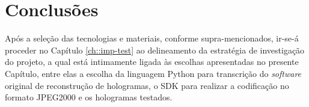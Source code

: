 \section{Conclusões}
\label{sec::tecno-ferr:conclusao}

Após a seleção das tecnologias e materiais, conforme supra-mencionados, ir-se-á proceder no Capítulo \ref{ch::imp-test} ao delineamento da estratégia de investigação do projeto, a qual está intimamente ligada às escolhas apresentadas no presente Capítulo, entre elas a escolha da linguagem Python para transcrição do \textit{software} original de reconstrução de hologramas, o \ac{SDK} para realizar a codificação no formato JPEG2000 e os hologramas testados.
